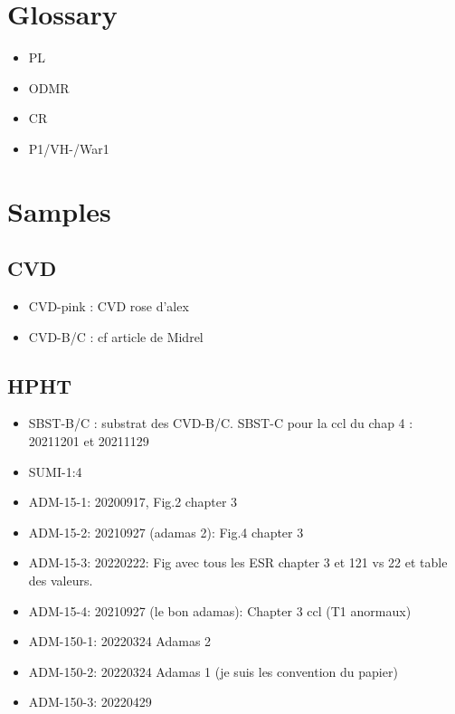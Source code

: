 \documentclass[a4paper]{article}
\begin{document}
\section{Glossary}
\begin{itemize}
\item PL
\item ODMR
\item CR
\item P1/VH-/War1
\end{itemize}
\section{Samples}
\subsection{CVD}
\begin{itemize}
\item CVD-pink : CVD rose d'alex
\item CVD-B/C : cf article de Midrel
\end{itemize}
\subsection{HPHT}
\begin{itemize}
\item SBST-B/C : substrat des CVD-B/C. SBST-C pour la ccl du chap 4 : 20211201 et 20211129
\item SUMI-1:4
\item ADM-15-1: 20200917, Fig.2 chapter 3
\item ADM-15-2: 20210927 (adamas 2): Fig.4 chapter 3
\item ADM-15-3: 20220222: Fig avec tous les ESR chapter 3 et 121 vs 22 et table des valeurs.
\item ADM-15-4: 20210927 (le bon adamas): Chapter 3 ccl (T1 anormaux)
\item ADM-150-1: 20220324 Adamas 2
\item ADM-150-2: 20220324 Adamas 1 (je suis les convention du papier)
\item ADM-150-3: 20220429
\end{itemize}
\end{document}
